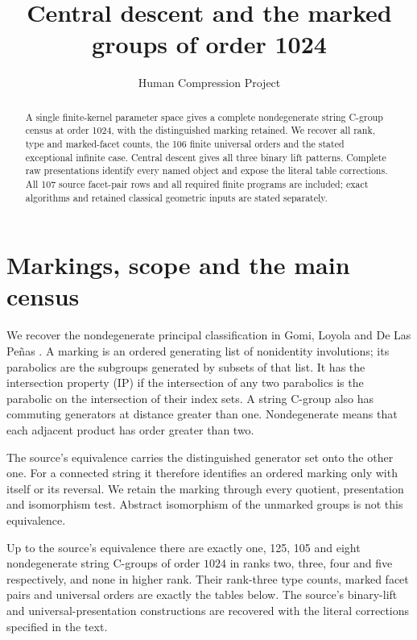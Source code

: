 
\usepackage{longtable,booktabs,array,calc}
\setlength{\emergencystretch}{4em}
\providecommand{\passthrough}[1]{#1}
\title{Central descent and the marked groups of order 1024}
\author{Human Compression Project}
\date{}

\maketitle
\begin{abstract}
A single finite-kernel parameter space gives a complete nondegenerate
string C-group census at order 1024, with the distinguished marking
retained. We recover all rank, type and marked-facet counts, the 106
finite universal orders and the stated exceptional infinite case.
Central descent gives all three binary lift patterns. Complete raw
presentations identify every named object and expose the literal table
corrections. All 107 source facet-pair rows and all required finite
programs are included; exact algorithms and retained classical
geometric inputs are stated separately.
\end{abstract}
\section{Markings, scope and the main census}
We recover the nondegenerate principal classification in Gomi, Loyola
and De Las Pe\~nas \cite{GLP}. A marking is an ordered generating list
of nonidentity involutions; its parabolics are the subgroups generated
by subsets of that list. It has the intersection property (IP) if the
intersection of any two parabolics is the parabolic on the intersection
of their index sets. A string C-group also has commuting generators at
distance greater than one. Nondegenerate means that each adjacent
product has order greater than two.

The source's equivalence carries the distinguished generator set onto
the other one. For a connected string it therefore identifies an
ordered marking only with itself or its reversal. We retain the marking
through every quotient, presentation and isomorphism test. Abstract
isomorphism of the unmarked groups is not this equivalence.

\begin{theorem}
Up to the source's equivalence there are exactly one, 125, 105 and eight
nondegenerate string C-groups of order $1024$ in ranks two, three, four
and five respectively, and none in higher rank. Their rank-three type
counts, marked facet pairs and universal orders are exactly the tables
below. The source's binary-lift and universal-presentation constructions
are recovered with the literal corrections specified in the text.
\end{theorem}

